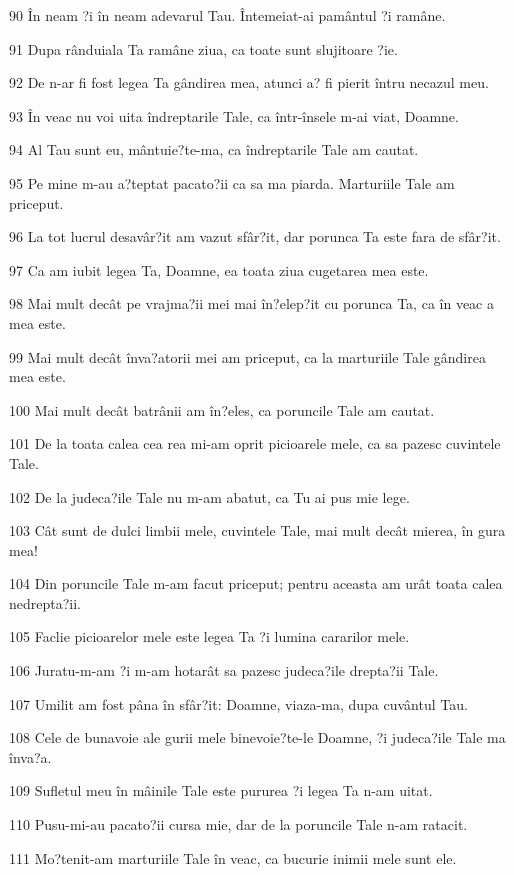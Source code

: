 \par 90 În neam ?i în neam adevarul Tau. Întemeiat-ai pamântul ?i ramâne.
\par 91 Dupa rânduiala Ta ramâne ziua, ca toate sunt slujitoare ?ie.
\par 92 De n-ar fi fost legea Ta gândirea mea, atunci a? fi pierit întru necazul meu.
\par 93 În veac nu voi uita îndreptarile Tale, ca într-însele m-ai viat, Doamne.
\par 94 Al Tau sunt eu, mântuie?te-ma, ca îndreptarile Tale am cautat.
\par 95 Pe mine m-au a?teptat pacato?ii ca sa ma piarda. Marturiile Tale am priceput.
\par 96 La tot lucrul desavâr?it am vazut sfâr?it, dar porunca Ta este fara de sfâr?it.
\par 97 Ca am iubit legea Ta, Doamne, ea toata ziua cugetarea mea este.
\par 98 Mai mult decât pe vrajma?ii mei mai în?elep?it cu porunca Ta, ca în veac a mea este.
\par 99 Mai mult decât înva?atorii mei am priceput, ca la marturiile Tale gândirea mea este.
\par 100 Mai mult decât batrânii am în?eles, ca poruncile Tale am cautat.
\par 101 De la toata calea cea rea mi-am oprit picioarele mele, ca sa pazesc cuvintele Tale.
\par 102 De la judeca?ile Tale nu m-am abatut, ca Tu ai pus mie lege.
\par 103 Cât sunt de dulci limbii mele, cuvintele Tale, mai mult decât mierea, în gura mea!
\par 104 Din poruncile Tale m-am facut priceput; pentru aceasta am urât toata calea nedrepta?ii.
\par 105 Faclie picioarelor mele este legea Ta ?i lumina cararilor mele.
\par 106 Juratu-m-am ?i m-am hotarât sa pazesc judeca?ile drepta?ii Tale.
\par 107 Umilit am fost pâna în sfâr?it: Doamne, viaza-ma, dupa cuvântul Tau.
\par 108 Cele de bunavoie ale gurii mele binevoie?te-le Doamne, ?i judeca?ile Tale ma înva?a.
\par 109 Sufletul meu în mâinile Tale este pururea ?i legea Ta n-am uitat.
\par 110 Pusu-mi-au pacato?ii cursa mie, dar de la poruncile Tale n-am ratacit.
\par 111 Mo?tenit-am marturiile Tale în veac, ca bucurie inimii mele sunt ele.
